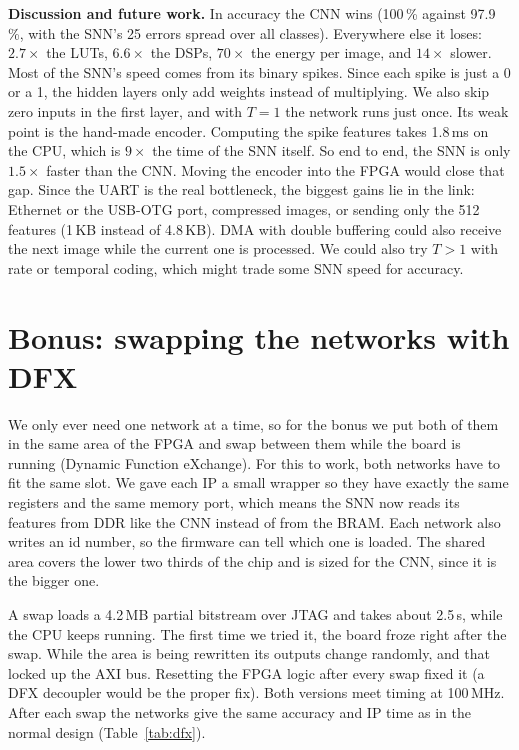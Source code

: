 \documentclass[10pt,a4paper]{article}
\begin{document}
\textbf{Discussion and future work.} In accuracy the CNN wins (100\,\% against 97.9\,\%,
with the SNN's 25 errors spread over all classes). Everywhere else it loses: $2.7\times$ the
LUTs, $6.6\times$ the DSPs, $70\times$ the energy per image, and $14\times$ slower. Most of the
SNN's speed comes from its binary spikes. Since each spike is just a 0 or a 1, the hidden layers
only add weights instead of multiplying. We also skip zero inputs in the first layer, and with
$T=1$ the network runs just once. Its weak point is the hand-made encoder. Computing the spike
features takes 1.8\,ms on the CPU, which is $9\times$ the time of the SNN itself. So end to end,
the SNN is only $1.5\times$ faster than the CNN. Moving the encoder into the FPGA would close that
gap. Since
the UART is the real bottleneck, the biggest gains lie in the link: Ethernet or the USB-OTG
port, compressed images, or sending only the 512 features (1\,KB instead of 4.8\,KB). DMA with
double buffering could also receive the next image while the current one is processed.
We could also try $T>1$ with rate or temporal coding, which might trade some SNN speed for accuracy.

\section{Bonus: swapping the networks with DFX}
We only ever need one network at a time, so for the bonus we put both of them in the same
area of the FPGA and swap between them while the board is running (Dynamic Function eXchange).
For this to work, both networks have to fit the same slot. We gave each IP a small wrapper so
they have exactly the same registers and the same memory port, which means the SNN now reads
its features from DDR like the CNN instead of from the BRAM. Each network also writes an id
number, so the firmware can tell which one is loaded. The shared area covers the lower two
thirds of the chip and is sized for the CNN, since it is the bigger one.

A swap loads a 4.2\,MB partial bitstream over JTAG and takes about 2.5\,s, while the CPU
keeps running. The first time we tried it, the board froze right after the swap. While the
area is being rewritten its outputs change randomly, and that locked up the AXI bus. Resetting
the FPGA logic after every swap fixed it (a DFX decoupler would be the proper fix). Both
versions meet timing at 100\,MHz. After each swap the networks give the same accuracy and IP
time as in the normal design (Table~\ref{tab:dfx}).
\end{document}
